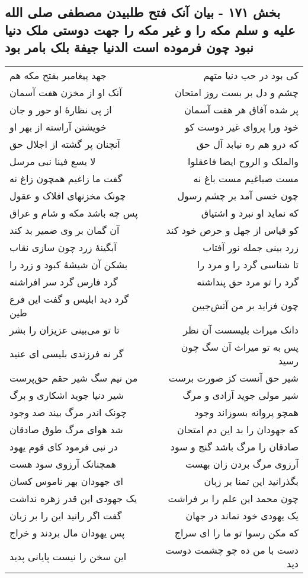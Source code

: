 \begin{center}
\section*{بخش ۱۷۱ - بیان آنک فتح طلبیدن مصطفی صلی الله علیه و سلم مکه را و غیر مکه را جهت دوستی ملک دنیا نبود چون فرموده است الدنیا جیفة بلک بامر بود}
\label{sec:sh171}
\begin{longtable}{l p{0.5cm} r}
جهد پیغامبر بفتح مکه هم
&&
کی بود در حب دنیا متهم
\\
آنک او از مخزن هفت آسمان
&&
چشم و دل بر بست روز امتحان
\\
از پی نظارهٔ او حور و جان
&&
پر شده آفاق هر هفت آسمان
\\
خویشتن آراسته از بهر او
&&
خود ورا پروای غیر دوست کو
\\
آنچنان پر گشته از اجلال حق
&&
که درو هم ره نیابد آل حق
\\
لا یسع فینا نبی مرسل
&&
والملک و الروح ایضا فاعقلوا
\\
گفت ما زاغیم همچون زاغ نه
&&
مست صباغیم مست باغ نه
\\
چونک مخزنهای افلاک و عقول
&&
چون خسی آمد بر چشم رسول
\\
پس چه باشد مکه و شام و عراق
&&
که نماید او نبرد و اشتیاق
\\
آن گمان بر وی ضمیر بد کند
&&
کو قیاس از جهل و حرص خود کند
\\
آبگینهٔ زرد چون سازی نقاب
&&
زرد بینی جمله نور آفتاب
\\
بشکن آن شیشهٔ کبود و زرد را
&&
تا شناسی گرد را و مرد را
\\
گرد فارس گرد سر افراشته
&&
گرد را تو مرد حق پنداشته
\\
گرد دید ابلیس و گفت این فرع طین
&&
چون فزاید بر من آتش‌جبین
\\
تا تو می‌بینی عزیزان را بشر
&&
دانک میراث بلیسست آن نظر
\\
گر نه فرزندی بلیسی ای عنید
&&
پس به تو میراث آن سگ چون رسید
\\
من نیم سگ شیر حقم حق‌پرست
&&
شیر حق آنست کز صورت برست
\\
شیر دنیا جوید اشکاری و برگ
&&
شیر مولی جوید آزادی و مرگ
\\
چونک اندر مرگ بیند صد وجود
&&
همچو پروانه بسوزاند وجود
\\
شد هوای مرگ طوق صادقان
&&
که جهودان را بد این دم امتحان
\\
در نبی فرمود کای قوم یهود
&&
صادقان را مرگ باشد گنج و سود
\\
همچنانک آرزوی سود هست
&&
آرزوی مرگ بردن زان بهست
\\
ای جهودان بهر ناموس کسان
&&
بگذرانید این تمنا بر زبان
\\
یک جهودی این قدر زهره نداشت
&&
چون محمد این علم را بر فراشت
\\
گفت اگر رانید این را بر زبان
&&
یک یهودی خود نماند در جهان
\\
پس یهودان مال بردند و خراج
&&
که مکن رسوا تو ما را ای سراج
\\
این سخن را نیست پایانی پدید
&&
دست با من ده چو چشمت دوست دید
\\
\end{longtable}
\end{center}
